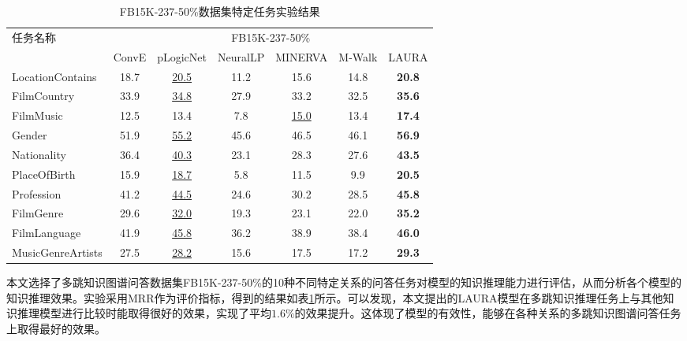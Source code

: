 \documentclass[algorithmlist, AutoFakeBold, AutoFakeSlant, figurelist, tablelist, nomlist, engineering, openany]{seuthesix} %
\begin{document}
\begin{table}[t]
  \centering
  \caption{FB15K-237-50\%数据集特定任务实验结果}
  \begin{tabular*}{1\textwidth}{@{\extracolsep{\fill}}lcccccc}
    \toprule[1pt]
    \multirow{2}{*}{任务名称} & \multicolumn{6}{c}{FB15K-237-50\%} \\
      & ConvE & pLogicNet & NeuralLP & MINERVA & M-Walk & LAURA \\ \hline
    LocationContains & 18.7 & \underline{20.5} & 11.2 & 15.6 & 14.8 & \textbf{20.8} \\
    FilmCountry & 33.9 & \underline{34.8} & 27.9 & 33.2 & 32.5 & \textbf{35.6} \\
    FilmMusic & 12.5 & 13.4 & 7.8 & \underline{15.0} & 13.4 & \textbf{17.4} \\
    Gender & 51.9 & \underline{55.2} & 45.6 & 46.5 & 46.1 & \textbf{56.9} \\
    Nationality & 36.4 & \underline{40.3} & 23.1 & 28.3 & 27.6 & \textbf{43.5} \\
    PlaceOfBirth & 15.9 & \underline{18.7} & 5.8 & 11.5 & 9.9 & \textbf{20.5} \\
    Profession & 41.2 & \underline{44.5} & 24.6 & 30.2 & 28.5 & \textbf{45.8} \\
    FilmGenre & 29.6 & \underline{32.0} & 19.3 & 23.1 & 22.0 & \textbf{35.2} \\
    FilmLanguage & 41.9 & \underline{45.8} & 36.2 & 38.9 & 38.4 & \textbf{46.0} \\
    MusicGenreArtists & 27.5 & \underline{28.2} & 15.6 & 17.5 & 17.2 & \textbf{29.3} \\
    \bottomrule[1pt]
  \end{tabular*}
  \label{Experiment2_tasks}
\end{table}

本文选择了多跳知识图谱问答数据集FB15K-237-50\%的10种不同特定关系的问答任务对模型的知识推理能力进行评估，从而分析各个模型的知识推理效果。实验采用MRR作为评价指标，得到的结果如表\ref{Experiment2_tasks}所示。可以发现，本文提出的LAURA模型在多跳知识推理任务上与其他知识推理模型进行比较时能取得很好的效果，实现了平均$1.6\%$的效果提升。这体现了模型的有效性，能够在各种关系的多跳知识图谱问答任务上取得最好的效果。
\end{document}
